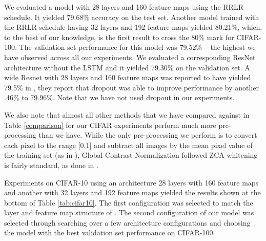 \documentclass{article}
\begin{document}
We evaluated a model with 28 layers and 160 feature maps using the RRLR schedule. It yielded 79.68\% accuracy on the test set. Another model trained with the RRLR schedule having 32 layers and 192 feature maps yielded 80.21\%, which, to the best of our knowledge, is the first result to cross the 80\% mark for CIFAR-100. The validation set performance for this model was 79.52\% -- the highest we have observed across all our experiments. We evaluated a corresponding ResNet architecture without the LSTM and it yielded 79.30\% on the validation set. %
A wide Resnet with 28 layers and 160 feature maps was reported to have yielded 79.5\% in \cite{zagoruyko2016wide}, they report that dropout was able to improve performance by another .46\% to 79.96\%. Note that we have not used dropout in our experiments.


We also note that almost all other methods that we have compared against in Table \ref{comparison} for our CIFAR experiments perform much more pre-processing than we have. While the only pre-processing we perform is to convert each pixel to the range [0,1] and subtract all images by the mean pixel value of the training set (as in \cite{zeiler2013stochastic}), Global Contrast Normalization followed ZCA whitening is fairly standard, as done in \cite{goodfellow2013maxout}.

Experiments on CIFAR-10 using an architecture 28 layers with 160 feature maps and another with 32 layers and 192 feature maps yielded the results shown at the bottom of Table \ref{tab:cifar10}.
The first configuration was selected to match the layer and feature map structure of \cite{zagoruyko2016wide}. The second configuration of our model was selected through searching over a few architecture configurations and choosing the model with the best validation set performance on CIFAR-100. %
\end{document}
